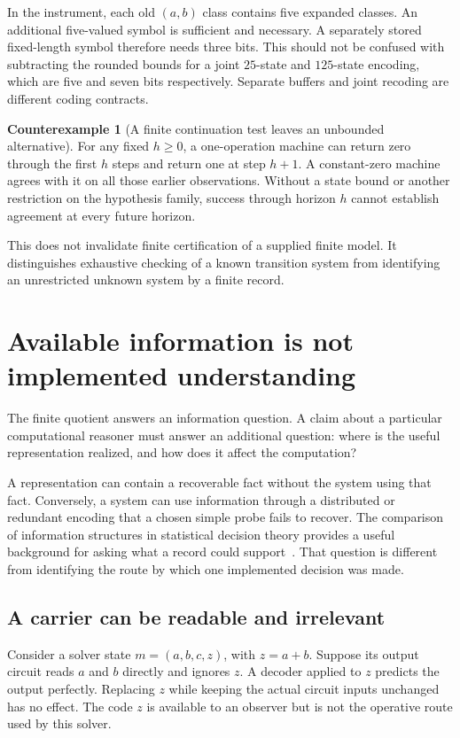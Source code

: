 \documentclass[11pt,letterpaper]{article}
\theoremstyle{plain}
\theoremstyle{definition}
\newtheorem{counterexample}[theorem]{Counterexample}
\begin{document}
In the instrument, each old $(a,b)$ class contains five expanded classes. An additional five-valued symbol is sufficient and necessary. A separately stored fixed-length symbol therefore needs three bits. This should not be confused with subtracting the rounded bounds for a joint $25$-state and $125$-state encoding, which are five and seven bits respectively. Separate buffers and joint recoding are different coding contracts.

\begin{counterexample}[A finite continuation test leaves an unbounded alternative]\label{ex:horizon}
For any fixed $h\geq0$, a one-operation machine can return zero through the first $h$ steps and return one at step $h+1$. A constant-zero machine agrees with it on all those earlier observations. Without a state bound or another restriction on the hypothesis family, success through horizon $h$ cannot establish agreement at every future horizon.
\end{counterexample}
This does not invalidate finite certification of a supplied finite model. It distinguishes exhaustive checking of a known transition system from identifying an unrestricted unknown system by a finite record.

\section{Available information is not implemented understanding}\label{sec:use}
The finite quotient answers an information question. A claim about a particular computational reasoner must answer an additional question: where is the useful representation realized, and how does it affect the computation?

A representation can contain a recoverable fact without the system using that fact. Conversely, a system can use information through a distributed or redundant encoding that a chosen simple probe fails to recover. The comparison of information structures in statistical decision theory provides a useful background for asking what a record could support~\cite{blackwell}. That question is different from identifying the route by which one implemented decision was made.

\subsection{A carrier can be readable and irrelevant}
Consider a solver state $m=(a,b,c,z)$, with $z=a+b$. Suppose its output circuit reads $a$ and $b$ directly and ignores $z$. A decoder applied to $z$ predicts the output perfectly. Replacing $z$ while keeping the actual circuit inputs unchanged has no effect. The code $z$ is available to an observer but is not the operative route used by this solver.
\end{document}
